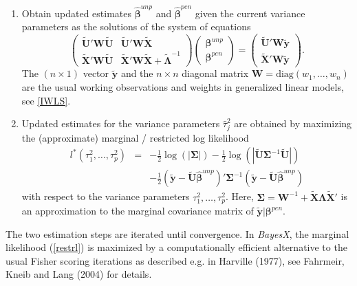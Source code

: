 \documentclass[11pt,a4paper,twoside]{bayesxarticle}
\newcommand{\diag}{\mbox{diag}}
\def \Lambdavec {\boldsymbol{\Lambda}}
\def \betavec {\boldsymbol{\beta}}
\def \Sigmavec {\boldsymbol{\Sigma}}
\def \yvec {\mathbf{y}}
\def \Uvec {\mathbf{U}}
\def \Wvec {\mathbf{W}}
\def \Xvec {\mathbf{X}}
\begin{document}
\begin{enumerate}
\item Obtain updated estimates $\hat{\betavec}^{unp}$ and $\hat{\betavec}^{pen}$ given the current variance parameters
as the solutions of the system of equations
\begin{equation}
\label{equsystem} \left(
\begin{array}{ll}
\tilde{\Uvec}' \Wvec  \tilde{\Uvec} & \tilde{\Uvec}' \Wvec  \tilde{\Xvec} \\
\tilde{\Xvec}' \Wvec  \tilde{\Uvec} & \tilde{\Xvec}' \Wvec  \tilde{\Xvec} +
\tilde{\Lambdavec}^{-1}
\end{array}
\right) \left(
\begin{array}{l}
\betavec^{unp} \\
\betavec^{pen}
\end{array}
\right) = \left(
\begin{array}{l}
\tilde{\Uvec}' \Wvec \tilde{\yvec} \\
\tilde{\Xvec}'\Wvec \tilde{\yvec}
\end{array}
\right).
\end{equation}
The $(n \times 1)$ vector $\tilde{\yvec}$ and the $n \times n$ diagonal
matrix $\Wvec = \diag(w_1,\dots,w_n)$ are the usual working observations
and weights in generalized linear models, see \autoref{IWLS}.
\item Updated estimates for the variance parameters $\hat{\tau}_j^2$ are obtained by maximizing
the (approximate) marginal / restricted log likelihood
\begin{equation}
\label{restrl}
\begin{array}{lll}
l^{\ast}(\tau^2_1,\dots,\tau^2_p) & = & -\frac{1}{2}
\log(|\Sigmavec|) - \frac{1}{2} \log(|\tilde{\Uvec} \Sigmavec^{-1}
\tilde{\Uvec}|) \\ [0.3cm] & & - \frac{1}{2} (\tilde{\yvec} - \tilde{\Uvec}
\hat{\betavec}^{unp})' \Sigmavec^{-1} (\tilde{\yvec} - \tilde{\Uvec}
\hat{\betavec}^{unp})
\end{array}
\end{equation}
with respect to the variance parameters $\tau^2_1,\dots,\tau^2_p$.
Here, $\Sigmavec = \Wvec^{-1} + \tilde{\Xvec} \Lambdavec \tilde{\Xvec}'$ is an
approximation to the marginal covariance matrix of $\tilde{\yvec} |
\betavec^{pen}$.
\end{enumerate}

The two estimation steps are iterated until convergence. In {\em
BayesX}, the marginal likelihood (\ref{restrl}) is maximized by a
computationally efficient alternative to the usual Fisher scoring
iterations as described e.g. in Harville (1977), see Fahrmeir, Kneib
and Lang (2004) for details.
\end{document}
